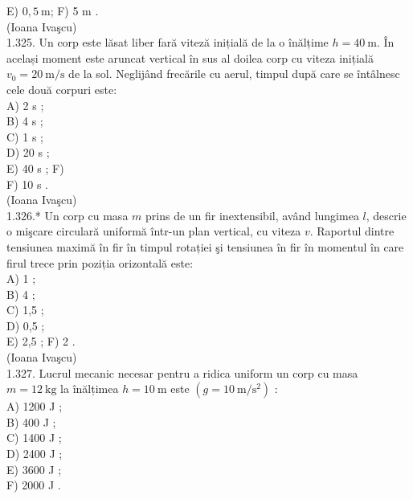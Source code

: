 \documentclass[10pt]{article}
\begin{document}
E) $0,5 \mathrm{~m}$; F) 5 m .\\
(Ioana Ivaşcu)\\
1.325. Un corp este lăsat liber fară viteză inițială de la o înălțime $h=40 \mathrm{~m}$. În același moment este aruncat vertical în sus al doilea corp cu viteza inițială $v_{0}=20 \mathrm{~m} / \mathrm{s}$ de la sol. Neglijând frecările cu aerul, timpul după care se întâlnesc cele două corpuri este:\\
A) 2 s ;\\
B) 4 s ;\\
C) 1 s ;\\
D) 20 s ;\\
E) 40 s ; F)\\
F) 10 s .\\
(Ioana Ivaşcu)\\
1.326.* Un corp cu masa $m$ prins de un fir inextensibil, având lungimea $l$, descrie o mişcare circulară uniformă într-un plan vertical, cu viteza $v$. Raportul dintre tensiunea maximă în fir în timpul rotației şi tensiunea în fir în momentul în care firul trece prin poziția orizontală este:\\
A) 1 ;\\
B) 4 ;\\
C) 1,5 ;\\
D) 0,5 ;\\
E) 2,5 ; F) 2 .\\
(Ioana Ivaşcu)\\
1.327. Lucrul mecanic necesar pentru a ridica uniform un corp cu masa $m=12 \mathrm{~kg}$ la înălțimea $h=10 \mathrm{~m}$ este $\left(g=10 \mathrm{~m} / \mathrm{s}^{2}\right)$ :\\
A) 1200 J ;\\
B) 400 J ;\\
C) 1400 J ;\\
D) 2400 J ;\\
E) 3600 J ;\\
F) 2000 J .
\end{document}
